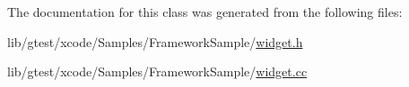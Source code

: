The documentation for this class was generated from the following files\-:\begin{DoxyCompactItemize}
\item 
lib/gtest/xcode/\-Samples/\-Framework\-Sample/\hyperlink{widget_8h}{widget.\-h}\item 
lib/gtest/xcode/\-Samples/\-Framework\-Sample/\hyperlink{widget_8cc}{widget.\-cc}\end{DoxyCompactItemize}
